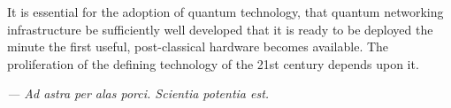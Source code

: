 \documentclass[aps,rmp,twocolumn,amsmath,amssymb,nofootinbib,superscriptaddress]{revtex4}
\begin{document}
It is essential for the adoption of quantum technology, that quantum networking infrastructure be sufficiently well developed that it is ready to be deployed the minute the first useful, post-classical hardware becomes available. The proliferation of the defining technology of the 21st century depends upon it.

\emph{--- Ad astra per alas porci. Scientia potentia est.}

%
%

\begin{acknowledgments}
\end{acknowledgments}

%
%


\end{document}
